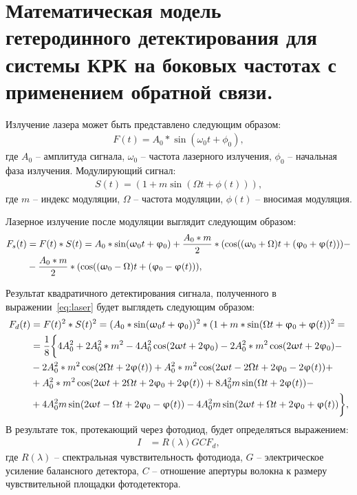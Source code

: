 \section{Математическая модель гетеродинного детектирования для системы КРК на боковых частотах с применением обратной связи.}\label{sec:ch2/sect3}
Излучение лазера может быть представлено следующим образом:
\begin{align}
F(t) = A_0 * \sin(\omega_0 t + \phi_0),
\end{align}
где $A_0$ -- амплитуда сигнала, $\omega_0$ -- частота лазерного излучения, $\phi_0$ -- начальная фаза излучения.
Модулирующий сигнал:
\begin{align}
S(t) = (1+ m\sin(\Omega t  + \phi (t))),
\end{align} 
где $m$ -- индекс модуляции, $\Omega$ -- частота модуляции, $\phi (t)$ -- вносимая модуляция.

Лазерное излучение после модуляции выглядит следующим образом:
\begin{align}
\label{eq:laser}
F_s(t) &= F(t) * S(t) = A_0 * \sin(\omega_0 t + \phi_0) + \frac{A_0 * m}{2} * (\cos((\omega_0 + \Omega)t + (\phi_0 + \phi (t))) - \notag \\
&- \frac{A_0 * m}{2} * (\cos((\omega_0 - \Omega)t + (\phi_0 - \phi (t))),
\end{align}

Результат квадратичного детектирования сигнала, полученного в выражении~\eqref{eq:laser} будет выглядеть следующим образом:
\begin{align}
F_d(t) &= F(t)^2 * S(t)^2 = (A_0 * \sin (\omega_0 t + \phi_0))^2 * (1 + m*\sin (\Omega t + \phi_0 + \phi (t))^2=\notag \\
&= \frac{1}{8}\bigg \{4A_0^2 + 2A_0^2 *m^2 - 4A_0^2\cos(2\omega t + 2\phi_0) - 2A_0^2*m^2\cos(2\omega t + 2\phi_0) - \notag \\ & - 2A_0^2*m^2\cos(2\Omega t + 2\phi(t))  + A_0^2*m^2\cos(2\omega t - 2\Omega t + 2\phi_0 - 2\phi(t)) + \notag \\ & + A_0^2*m^2\cos(2\omega t + 2\Omega t + 2\phi_0 + 2\phi(t)) + 8A_0^2m\sin(\Omega t + 2\phi(t)) -\notag \\ & + 4A_0^2m\sin(2\omega t - \Omega t +2\phi_0 - \phi(t)) - 4A_0^2m\sin(2\omega t + \Omega t + 2\phi_0 + \phi(t))   \bigg\},
\end{align}
В результате ток, протекающий через фотодиод, будет определяться выражением:
\begin{align}
   I &= R(\lambda)G C F_d,
\end{align} 
где $R(\lambda)$ -- спектральная чувствительность фотодиода, $G$ -- электрическое усиление балансного детектора, $C$ -- отношение апертуры волокна к размеру чувствительной площадки фотодетектора. 

